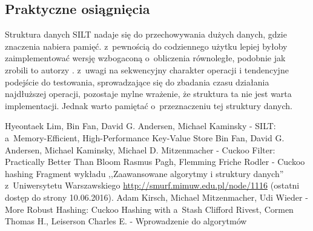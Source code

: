\documentclass[declaration,shortabstract,masc]{iithesis}
\begin{document}
			\subsection{Praktyczne osiągnięcia}
				Struktura danych SILT nadaje się do przechowywania dużych danych, gdzie znaczenia nabiera pamięć. z~pewnością do codziennego użytku lepiej byłoby zaimplementować wersję wzbogaconą o~obliczenia równoległe, podobnie jak zrobili to autorzy \cite{SILT}. z~uwagi na sekwencyjny charakter operacji i tendencyjne podejście do testowania, sprowadzające się do zbadania czasu działania najdłuższej operacji, pozostaje mylne wrażenie, że struktura ta nie jest warta implementacji. Jednak warto pamiętać o~przeznaczeniu tej struktury danych.
	\begin{thebibliography}{3}
		 Hyeontaek Lim, Bin Fan, David G. Andersen, Michael Kaminsky - SILT: a~Memory-Efficient, High-Performance Key-Value Store
		 Bin Fan, David G. Andersen, Michael Kaminsky, Michael D. Mitzenmacher - Cuckoo Filter: Practically Better Than Bloom
		 Rasmus Pagh, Flemming Friche Rodler - Cuckoo hashing
		 Fragment wykładu ,,Zaawansowane algorytmy i struktury danych'' z~Uniwersytetu Warszawskiego \url{http://smurf.mimuw.edu.pl/node/1116} (ostatni dostęp do strony 10.06.2016).
		 Adam Kirsch, Michael Mitzenmacher, Udi Wieder - More Robust Hashing: Cuckoo Hashing with a~Stash
		 Clifford Rivest, Cormen Thomas H., Leiserson Charles E. - Wprowadzenie do algorytmów
	\end{thebibliography}
\end{document}
